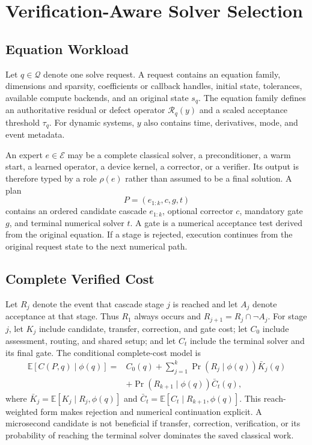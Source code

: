 \section{Verification-Aware Solver Selection}
\label{sec:formulation}

\subsection{Equation Workload}

Let $q\in\mathcal{Q}$ denote one solve request. A request contains an equation
family, dimensions and sparsity, coefficients or callback handles, initial state,
tolerances, available compute backends, and an original state $s_q$. The equation
family defines an authoritative residual or defect operator
$\mathcal{R}_q(y)$ and a scaled acceptance threshold $\tau_q$. For dynamic
systems, $y$ also contains time, derivatives, mode, and event metadata.

An expert $e\in\mathcal{E}$ may be a complete classical solver, a preconditioner,
a warm start, a learned operator, a device kernel, a corrector, or a verifier. Its
output is therefore typed by a role $\rho(e)$ rather than assumed to be a final
solution. A plan
\begin{equation}
  P=(e_{1:k},c,g,t)
\end{equation}
contains an ordered candidate cascade $e_{1:k}$, optional corrector $c$, mandatory
gate $g$, and terminal numerical solver $t$. A gate is a numerical acceptance test
derived from the original equation. If a stage is rejected, execution continues from
the original request state to the next numerical path.

\subsection{Complete Verified Cost}

Let $R_j$ denote the event that cascade stage $j$ is reached and let $A_j$
denote acceptance at that stage. Thus $R_1$ always occurs and
$R_{j+1}=R_j\cap\neg A_j$. For stage $j$, let $K_j$ include candidate,
transfer, correction, and gate cost; let $C_0$ include assessment, routing, and
shared setup; and let $C_t$ include the terminal solver and its final gate. The
conditional complete-cost model is
\begin{align}
\mathbb{E}[C(P,q)\mid\phi(q)] ={}& C_0(q)
 + \sum_{j=1}^{k}\Pr(R_j\mid\phi(q))\bar K_j(q) \nonumber\\
&+\Pr(R_{k+1}\mid\phi(q))\bar C_t(q),
\label{eq:complete-cost}
\end{align}
where $\bar K_j=\mathbb{E}[K_j\mid R_j,\phi(q)]$ and
$\bar C_t=\mathbb{E}[C_t\mid R_{k+1},\phi(q)]$.
This reach-weighted form makes rejection and numerical continuation explicit. A microsecond
candidate is not beneficial if transfer, correction, verification, or its
probability of reaching the terminal solver dominates the saved classical work.

